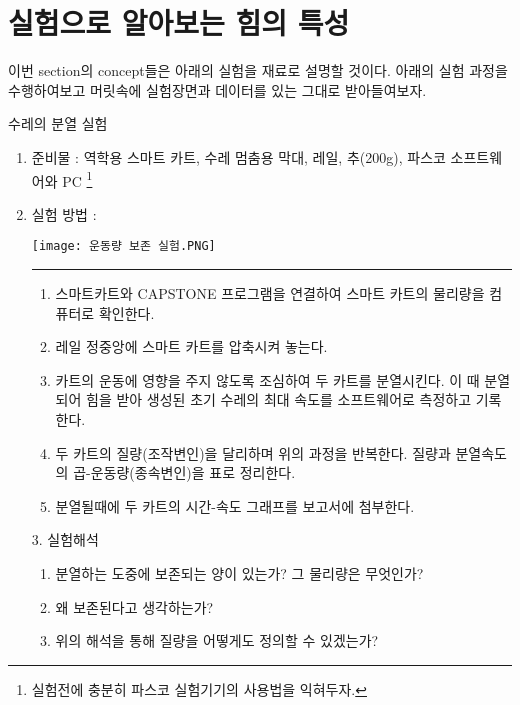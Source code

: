 
\section{실험으로 알아보는 힘의 특성}
\begin{flushleft}
이번 section의 concept들은 아래의 실험을 재료로 설명할 것이다. 아래의 실험 과정을 수행하여보고 
머릿속에 실험장면과 데이터를 있는 그대로 받아들여보자. 
 


\begin{exper}{ \Large {수레의 분열 실험} }

  \label{exp:Momentum}

  \begin{enumerate}
  \item 준비물 : 역학용 스마트 카트, 수레 멈춤용 막대, 레일, 추(200g), 파스코 소프트웨어와 PC
  \footnote{실험전에 충분히 파스코 실험기기의 사용법을 익혀두자.}\\


\item 실험 방법 : 

  {\texttt{[image: 운동량 보존 실험.PNG]}
  \label{fig:Momentum}}%
  {\rule{\linewidth}{4cm}}%


  \begin{enumerate}
    \item 스마트카트와 CAPSTONE 프로그램을 연결하여 스마트 카트의 물리량을 컴퓨터로 확인한다.
    \item 레일 정중앙에 스마트 카트를 압축시켜 놓는다.
    \item 카트의 운동에 영향을 주지 않도록 조심하여 두 카트를 분열시킨다. 이 때 분열되어 힘을 받아 생성된 초기 수레의 최대 속도를 
    소프트웨어로 측정하고 기록한다.
    \item 두 카트의 질량(조작변인)을 달리하며 위의 과정을 반복한다. 질량과 분열속도의 곱-운동량(종속변인)을 표로 정리한다.
    \item 분열될때에 두 카트의 시간-속도 그래프를 보고서에 첨부한다.
  \end{enumerate}

  
  \phantom{dh}3. 실험해석 
  \begin{enumerate}
    \item 분열하는 도중에 보존되는 양이 있는가? 그 물리량은 무엇인가?
    \item 왜 보존된다고 생각하는가?
    \item 위의 해석을 통해 질량을 어떻게도 정의할 수 있겠는가?
  \end{enumerate}


\end{enumerate}
\end{exper}
\end{flushleft}
